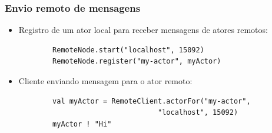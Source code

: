 \documentclass{beamer}
\begin{document}
\begin{frame}[fragile]
\frametitle{Envio remoto de mensagens}
	\begin{itemize}
		\item Registro de um ator local para receber mensagens de atores remotos:
	\begin{verbatim}
		RemoteNode.start("localhost", 15092)
		RemoteNode.register("my-actor", myActor)
	\end{verbatim}
	\item Cliente enviando mensagem para o ator remoto:
	\begin{verbatim}
		val myActor = RemoteClient.actorFor("my-actor", 
                                 "localhost", 15092)
		myActor ! "Hi"
	\end{verbatim}
	\end{itemize}
\end{frame}
\end{document}
